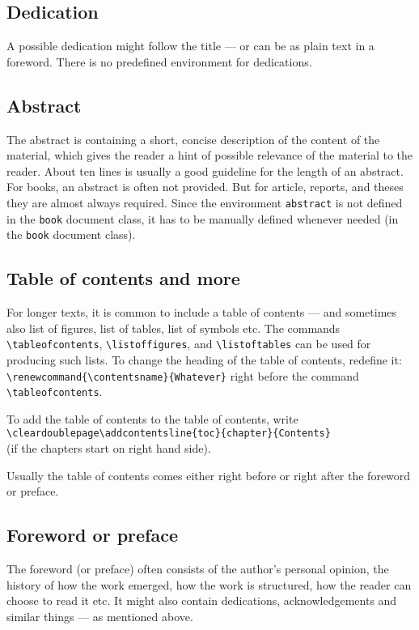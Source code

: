\documentclass[a4paper,12pt,twoside,openright,titlepage]{book}
\begin{document}
\subsection{Dedication}
A possible dedication might follow the title --- or can be as plain text in a foreword. 
There is no predefined environment for dedications.

\subsection{Abstract}
The abstract is containing a short, concise description of the content of the material, which gives the reader a hint of possible relevance of the material to the reader. About ten lines is usually a good guideline for the length of an abstract. 
For books, an abstract is often not provided. 
But for article, reports, and theses they are almost always required. 
Since the environment \texttt{abstract} is not defined in the \texttt{book} document class, it has to be manually defined whenever needed (in the \texttt{book} document class). 

\subsection{Table of contents and more}
\label{table_of_contents_and_more}
For longer texts, it is common to include a table of contents --- and sometimes also list of figures, list of tables, list of symbols etc. 
The commands \texttt{\textbackslash tableofcontents}, \texttt{\textbackslash listoffigures}, and \texttt{\textbackslash listoftables} can be used for producing such lists. To change the heading of the table of contents, redefine it: \texttt{\textbackslash renewcommand\{\textbackslash contentsname\}\{Whatever\}} right before the command 
\texttt{\textbackslash tableofcontents}.

To add the table of contents to the table of contents, write \\
\texttt{\textbackslash cleardoublepage\textbackslash addcontentsline\{toc\}\{chapter\}\{Contents\}}\\
(if the chapters start on right hand side). 

Usually the table of contents comes either right before or right after the foreword or preface. 

\subsection{Foreword or preface}
The foreword (or preface) often consists of the author's personal opinion, the history of how the work emerged, how the work is structured, how the reader can choose to read it etc. It might also contain dedications, acknowledgements and similar things --- as mentioned above. 
\end{document}
